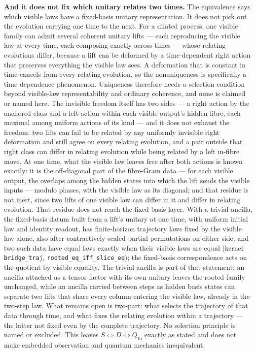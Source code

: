 \documentclass[
]{article}
\begin{document}
\textbf{And it does not fix which unitary relates two times.} The
equivalence says which visible laws have a fixed-basis unitary
representation. It does not pick out the evolution carrying one time to
the next. For a dilated process, one visible family can admit several
coherent unitary lifts --- each reproducing the visible law at every
time, each composing exactly across times --- whose relating evolutions
differ, because a lift can be deformed by a time-dependent right action
that preserves everything the visible law sees. A deformation that is
constant in time cancels from every relating evolution, so the
nonuniqueness is specifically a time-dependence phenomenon. Uniqueness
therefore needs a selection condition beyond visible-law
representability and ordinary coherence, and none is claimed or named
here. The invisible freedom itself has two sides --- a right action by
the anchored class and a left action within each visible output's hidden
fibre, each maximal among uniform actions of its kind --- and it does
not exhaust the freedom: two lifts can fail to be related by any
uniformly invisible right deformation and still agree on every relating
evolution, and a pair outside that right class can differ in relating
evolution while being related by a left in-fibre move. At one time, what
the visible law leaves free after both actions is known exactly: it is
the off-diagonal part of the fibre-Gram data --- for each visible
output, the overlaps among the hidden states into which the lift sends
the visible inputs --- modulo phases, with the visible law as its
diagonal; and that residue is not inert, since two lifts of one visible
law can differ in it and differ in relating evolution. That residue does
not reach the fixed-basis layer. With a trivial ancilla, the fixed-basis
datum built from a lift's unitary at one time, with uniform initial law
and identity readout, has finite-horizon trajectory laws fixed by the
visible law alone, also after contractively scaled partial permutations
on either side, and two such data have equal laws exactly when their
visible laws are equal (kernel: \texttt{bridge\_traj},
\texttt{rooted\_eq\_iff\_slice\_eq}); the fixed-basis correspondence
acts on the quotient by visible equality. The trivial ancilla is part of
that statement: an ancilla attached as a tensor factor with its own
unitary leaves the rooted family unchanged, while an ancilla carried
between steps as hidden basis states can separate two lifts that share
every column entering the visible law, already in the two-step law. What
remains open is two-part: what selects the trajectory of that data
through time, and what fixes the relating evolution within a trajectory
--- the latter not fixed even by the complete trajectory. No selection
principle is named or excluded. This leaves
\(S \iff D \iff Q_{\mathrm{fb}}\) exactly as stated and does not make
embedded observation and quantum mechanics inequivalent.
\end{document}
